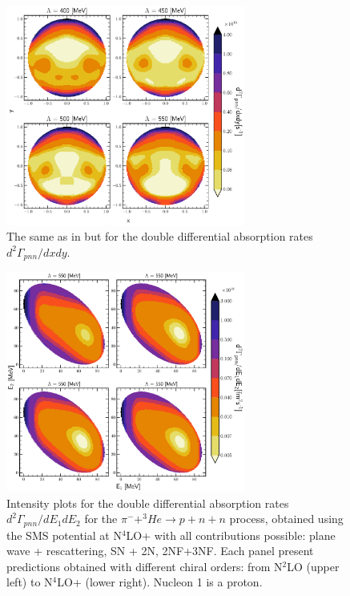     \begin{figure}[h]
        \begin{center}
        \includegraphics[width=0.7\textwidth]{PlotData/PION/Dalitz_maps/figures/Dalitz_map_pnn_xy_cutofs_1NC.pdf}
        \end{center}
        \caption{The same as in  but for the double differential absorption rates
        $d^2 \Gamma_{pnn}/dxdy$.}
        \label{pion_map_xy_cutoff_1NC}
    \end{figure}
    
    \begin{figure}[h]
        \begin{center}
            \includegraphics[width=0.7\textwidth]{PlotData/PION/Dalitz_maps/figures/Dalitz_map_pnn_E1E2_orders.pdf}
        \end{center}
        \caption{Intensity plots for the double differential absorption rates
        $d^2 \Gamma_{pnn}/dE_1dE_2$ for the $\pi^- + ^3He \rightarrow p + n + n$
        process, obtained using the SMS potential at N$^4$LO+
        with all contributions possible: plane wave + rescattering, SN + 2N, 2NF+3NF.
        Each panel present predictions obtained with different chiral orders:
        from N$^2$LO (upper left) to N$^4$LO+ (lower right). Nucleon 1 is a proton.}
        \label{pion_map_E1E2_order}
    \end{figure}

